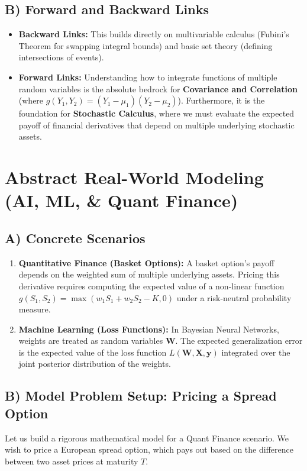 \documentclass[11pt, a4paper]{article}
\theoremstyle{definition}
\theoremstyle{remark}
\begin{document}
\subsection{B) Forward and Backward Links}
\begin{itemize}
    \item \textbf{Backward Links:} This builds directly on multivariable calculus (Fubini's Theorem for swapping integral bounds) and basic set theory (defining intersections of events).
    \item \textbf{Forward Links:} Understanding how to integrate functions of multiple random variables is the absolute bedrock for \textbf{Covariance and Correlation} (where $g(Y_1, Y_2) = (Y_1 - \mu_1)(Y_2 - \mu_2)$). Furthermore, it is the foundation for \textbf{Stochastic Calculus}, where we must evaluate the expected payoff of financial derivatives that depend on multiple underlying stochastic assets.
\end{itemize}

\section{Abstract Real-World Modeling (AI, ML, \& Quant Finance)}

\subsection{A) Concrete Scenarios}
\begin{enumerate}
    \item \textbf{Quantitative Finance (Basket Options):} A basket option's payoff depends on the weighted sum of multiple underlying assets. Pricing this derivative requires computing the expected value of a non-linear function $g(S_1, S_2) = \max(w_1 S_1 + w_2 S_2 - K, 0)$ under a risk-neutral probability measure.
    \item \textbf{Machine Learning (Loss Functions):} In Bayesian Neural Networks, weights are treated as random variables $\mathbf{W}$. The expected generalization error is the expected value of the loss function $L(\mathbf{W}, \mathbf{X}, \mathbf{y})$ integrated over the joint posterior distribution of the weights.
\end{enumerate}

\subsection{B) Model Problem Setup: Pricing a Spread Option}
Let us build a rigorous mathematical model for a Quant Finance scenario. We wish to price a European spread option, which pays out based on the difference between two asset prices at maturity $T$.
\end{document}
